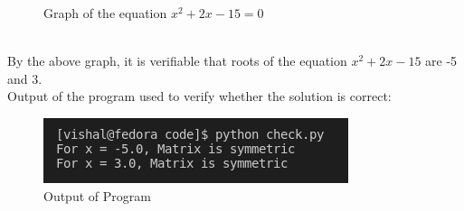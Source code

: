 \documentclass[journal,12pt,twocolumn]{IEEEtran}
\begin{document}
\begin{enumerate}[label=]
\begin{figure}[h]
	\caption{Graph of the equation $x^2 + 2x - 15 = 0$}
	\end{figure}\\
	By the above graph, it is verifiable that roots of the equation $x^2 + 2x - 15$ are -5 and 3. \\
	Output of the program used to verify whether the solution is correct:
	\begin{figure}[h]
	\includegraphics[width=\columnwidth]{./figs/Output.png}
	\caption{Output of Program}
	\end{figure}
\end{enumerate}
\end{document}

